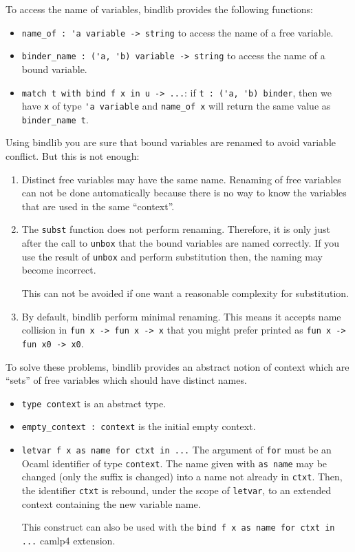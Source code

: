 \documentclass[11pt]{article}
\begin{document}
To access the name of variables, bindlib provides the following
functions:

\begin{itemize}
\item \verb#name_of : 'a variable -> string# to access the name of a free
  variable.

\item \verb#binder_name : ('a, 'b) variable -> string# to access the
  name of a bound variable.

\item \verb#match t with bind f x in u -> ...#: if
 \verb#t : ('a, 'b) binder#, then we have \verb#x# of type \verb#'a variable# and
 \verb#name_of x# will return the same value as \verb#binder_name t#.
\end{itemize}

Using bindlib you are sure that bound variables are renamed to avoid
variable conflict. But this is not enough:
\begin{enumerate}
\item Distinct free variables may have the same name. Renaming of free
  variables can not be done automatically because there is no way to
  know the variables that are used in the same ``context''.
\item The \verb#subst# function does not perform renaming. Therefore,
  it is only just after the call to \verb#unbox# that the bound
  variables are named correctly. If you use the result of \verb#unbox#
  and perform substitution then, the naming may become incorrect.

  This can not be avoided if one want a reasonable complexity for
  substitution.

\item By default, bindlib perform minimal renaming. This means it
  accepts name collision in \verb#fun x -> fun x -> x# that you might prefer printed as
\verb#fun x -> fun x0 -> x0#.
\end{enumerate}

To solve these problems, bindlib provides an abstract notion of context
 which are ``sets'' of free variables which should have
 distinct names.
\begin{itemize}
\item\verb#type context# is  an abstract type.
\item\verb#empty_context : context# is the initial empty context.
\item\verb#letvar f x as name for ctxt in ...# The argument of \verb#for# must be an Ocaml
identifier of type \verb#context#. The name given with \verb#as name#
may be changed (only the suffix is changed) into a name not already in
\verb#ctxt#. Then, the identifier  \verb#ctxt# is rebound, under the
scope of \verb#letvar#, to an extended context containing the new variable name.

This construct can also
be used with the \verb#bind f x as name for ctxt in ...# camlp4 extension.
\end{itemize}
\end{document}
